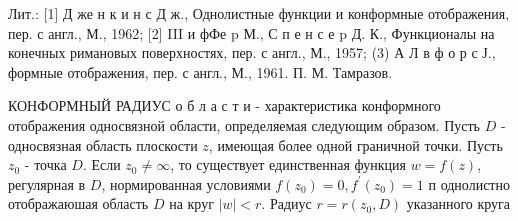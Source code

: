 \documentclass[10pt]{article}
\begin{document}
Лит.: [1] Д же н к и н с Д ж., Однолистные функции и конформные отображения, пер. с англ., М., 1962; [2] III и фФе p М., С п е н с е p Д. К., Функционалы на конечных римановых поверхностях, пер. с англ., М., 1957; (3) А Л в ф о р с Ј., формные отображения, пер. с англ., М., 1961. П. М. Тамразов.



КОНФОРМНЫЙ РАДИУС о б л а с т и - характеристика конформного отображения односвязной области, определяемая следующим образом. Пусть $D$ - односвязная область плоскости $z$, имеющая более одной граничной точки. Пусть $z_{0}$ - точка $D$. Если $z_{0} \neq \infty$, то существует единственная функция $w=f(z)$, регулярная в $D$, нормированная условиями $f\left(z_{0}\right)=0, f^{\prime}\left(z_{0}\right)=1$ п однолистно отображаюшая область $D$ на круг $|w|<r$. Радиус $r=r\left(z_{0}, D\right)$ указанного круга
\end{document}
